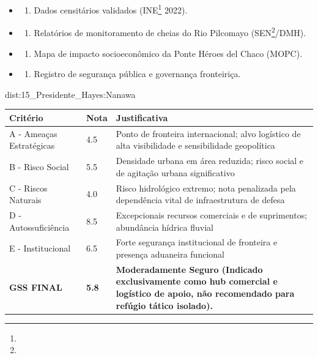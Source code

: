 {\begin{itemize}
\tightlist
\item
  \begin{enumerate}
  \def\labelenumi{\arabic{enumi})}
  \tightlist
  \item
    Dados censitários validados (INE\footnote{\fineINE} 2022).
  \end{enumerate}
\item
  \begin{enumerate}
  \def\labelenumi{\arabic{enumi})}
  \setcounter{enumi}{1}
  \tightlist
  \item
    Relatórios de monitoramento de cheias do Rio Pilcomayo (SEN\footnote{\fineSEN}/\allowbreak DMH).
  \end{enumerate}
\item
  \begin{enumerate}
  \def\labelenumi{\arabic{enumi})}
  \setcounter{enumi}{2}
  \tightlist
  \item
    Mapa de impacto socioeconômico da Ponte Héroes del Chaco (MOPC).
  \end{enumerate}
\item
  \begin{enumerate}
  \def\labelenumi{\arabic{enumi})}
  \setcounter{enumi}{3}
  \tightlist
  \item
    Registro de segurança pública e governança fronteiriça.
  \end{enumerate}
\end{itemize}}{dist:15_Presidente_Hayes:Nanawa}
\begin{table}[ht!]
\small \begin{tabular}{p{3.0cm}p{0.8cm}p{6.0cm}} \toprule
\textbf{Critério} & \textbf{Nota} & \textbf{Justificativa} \\ \midrule
A - Ameaças Estratégicas & 4.5 & Ponto de fronteira internacional; alvo logístico de alta visibilidade e sensibilidade geopolítica \\
B - Risco Social & 5.5 & Densidade urbana em área reduzida; risco social e de agitação urbana significativo \\
C - Riscos Naturais & 4.0 & Risco hidrológico extremo; nota penalizada pela dependência vital de infraestrutura de defesa \\
D - Autossuficiência & 8.5 & Excepcionais recursos comerciais e de suprimentos; abundância hídrica fluvial \\
E - Institucional & 6.5 & Forte segurança institucional de fronteira e presença aduaneira funcional \\
\midrule \textbf{GSS FINAL} & \textbf{5.8} & \textbf{Moderadamente Seguro (Indicado exclusivamente como hub comercial e logístico de apoio, não recomendado para refúgio tático isolado).} \\ \bottomrule \end{tabular}
\end{table}
